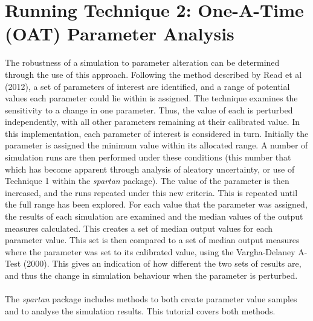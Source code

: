 \documentclass[a4paper,11pt]{article}
\begin{document}
\section{Running Technique 2: One-A-Time (OAT) Parameter Analysis}
\noindent The robustness of a simulation to parameter alteration can be determined through the use of this approach. Following the method described by Read et al (2012), a set of parameters of interest are identified, and a range of potential values each parameter could lie within is assigned.  The technique examines the sensitivity to a change in one parameter. Thus, the value of each is perturbed independently, with all other parameters remaining at their calibrated value. In this implementation, each parameter of interest is considered in turn. Initially the parameter is assigned the minimum value within its allocated range. A number of simulation runs are then performed under these conditions (this number that which has become apparent through analysis of aleatory uncertainty, or use of Technique 1 within the \textit{spartan} package). The value of the parameter is then increased, and the runs repeated under this new criteria.  This is repeated until the full range has been explored. For each value that the parameter was assigned, the results of each simulation are examined and the median values of the output measures calculated. This creates a set of median output values for each parameter value. This set is then compared to a set of median output measures where the parameter was set to its calibrated value, using the Vargha-Delaney A-Test (2000). This gives an indication of how different the two sets of results are, and thus the change in simulation behaviour when the parameter is perturbed.\\
\\
The \textit{spartan} package includes methods to both create parameter value samples and to analyse the simulation results. This tutorial covers both methods.\\
\end{document}
